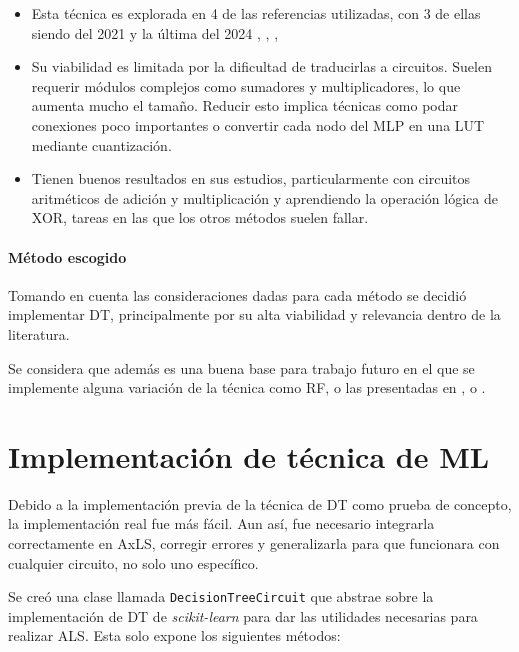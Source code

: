\begin{itemize}
    \item Esta técnica es explorada en 4 de las referencias utilizadas, con 3
      de ellas siendo del 2021 y la última del 2024
      \cite{boroumand_learning_2021}, \cite{miyasaka_logic_2021},
      \cite{rai_logic_2021}, \cite{prats_ramos_impact_2024}
    \item Su viabilidad es limitada por la dificultad de traducirlas a
      circuitos. Suelen requerir módulos complejos como sumadores y
      multiplicadores, lo que aumenta mucho el tamaño. Reducir esto implica
      técnicas como podar conexiones poco importantes o convertir cada nodo del
      MLP en una LUT mediante cuantización.
    \item Tienen buenos resultados en sus estudios, particularmente con
      circuitos aritméticos de adición y multiplicación y aprendiendo la
      operación lógica de XOR, tareas en las que los otros métodos suelen
      fallar.
\end{itemize}

\paragraph{Método escogido}

Tomando en cuenta las consideraciones dadas para cada método se decidió
implementar DT, principalmente por su alta viabilidad y relevancia dentro de la
literatura.

Se considera que además es una buena base para trabajo futuro en el que se implemente alguna variación de la técnica como RF, o las presentadas en \cite{hu_optdtals_2024}, \cite{zeng_sampling-based_2021} o \cite{huang_circuit_2023}.


\section{Implementación de técnica de ML}

Debido a la implementación previa de la técnica de DT como prueba de concepto,
la implementación real fue más fácil. Aun así, fue necesario integrarla
correctamente en AxLS, corregir errores y generalizarla para que funcionara con
cualquier circuito, no solo uno específico.

Se creó una clase llamada \texttt{DecisionTreeCircuit} que abstrae sobre la
implementación de DT de \emph{scikit-learn} para dar las utilidades necesarias
para realizar ALS. Esta solo expone los siguientes métodos:

